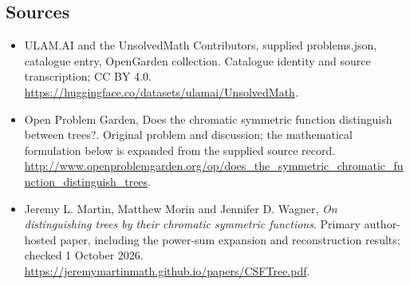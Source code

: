 \documentclass[11pt,a4paper]{article}
\begin{document}
\subsection{Sources}
\begin{itemize}
\item[S1] ULAM.AI and the UnsolvedMath Contributors, supplied problems.json, catalogue entry, OpenGarden collection. Catalogue identity and source transcription; CC BY 4.0.
\url{https://huggingface.co/datasets/ulamai/UnsolvedMath}.
\item[S2] Open Problem Garden, Does the chromatic symmetric function distinguish between trees?. Original problem and discussion; the mathematical formulation below is expanded from the supplied source record.
\url{http://www.openproblemgarden.org/op/does_the_symmetric_chromatic_function_distinguish_trees}.

\item[R1] Jeremy L. Martin, Matthew Morin and Jennifer D. Wagner,
\emph{On distinguishing trees by their chromatic symmetric functions}.
Primary author-hosted paper, including the power-sum expansion and
reconstruction results; checked 1 October 2026.
\url{https://jeremymartinmath.github.io/papers/CSFTree.pdf}.

\end{itemize}
\end{document}
